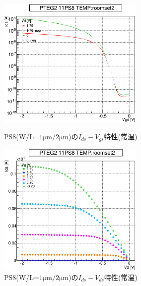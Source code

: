 				\begin{figure}[htbp]
					\begin{minipage}{0.5\hsize}
						\begin{center}
							\includegraphics[width=70mm]{./Chapter/Appendix/Picture/PST/PS8/PTEG2_11_PS8_IdVg_roomset2.eps}
						\end{center}
						\caption{PS8(W/L=$1\mathrm{\mu m}/2\mathrm{\mu m}$)の$I_{ds}-V_{gs}$特性(常温)}
						\label{fig:PS8_IdVg_room}
					\end{minipage}
					\begin{minipage}{0.5\hsize}
						\begin{center}
							\includegraphics[width=70mm]{./Chapter/Appendix/Picture/PST/PS8/PTEG2_11_PS8_IdVd_roomset2.eps}
						\end{center}
						\caption{PS8(W/L=$1\mathrm{\mu m}/2\mathrm{\mu m}$)の$I_{ds}-V_{ds}$特性(常温)}
						\label{fig:PS8_IdVd_room}
					\end{minipage}
				\end{figure}
				\clearpage
		

